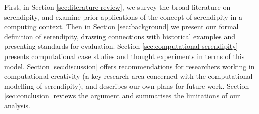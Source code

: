 First, in
Section \ref{sec:literature-review}, we survey the broad literature on
serendipity, and examine prior applications of the concept of serendipity in a computing context.  Then in Section \ref{sec:background} we present our formal
definition of serendipity, drawing connections with historical examples 
and presenting standards for evaluation.  Section
\ref{sec:computational-serendipity} presents computational case studies and
thought experiments in terms of this model.  Section
\ref{sec:discussion} offers recommendations for researchers working in
computational creativity (a key research area concerned with the computational modelling of serendipity), and describes our own plans for future
work.  Section \ref{sec:conclusion} reviews the argument and
summarises the limitations of our analysis.


